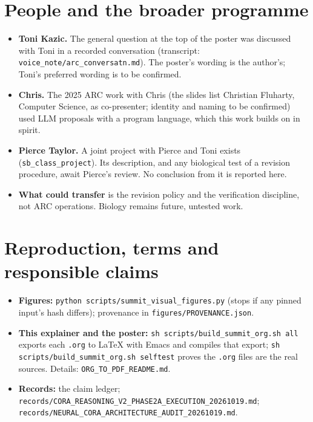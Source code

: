 \documentclass[11pt, a4paper]{article}
\begin{document}
\section{People and the broader programme}
\label{sec-people}
\begin{itemize}
\item \textbf{Toni Kazic.} The general question at the top of the poster was discussed with Toni in a recorded conversation
(transcript: \texttt{voice\_note/arc\_conversatn.md}). The poster's wording is the author's; Toni's preferred wording is to be
confirmed.
\item \textbf{Chris.} The 2025 ARC work with Chris (the slides list Christian Fluharty, Computer Science, as co-presenter;
identity and naming to be confirmed) used LLM proposals with a program language, which this work builds on in spirit.
\item \textbf{Pierce Taylor.} A joint project with Pierce and Toni exists (\texttt{sb\_class\_project}). Its description, and any biological
test of a revision procedure, await Pierce's review. No conclusion from it is reported here.
\item \textbf{What could transfer} is the revision policy and the verification discipline, not ARC operations. Biology remains
future, untested work.
\end{itemize}

\section{Reproduction, terms and responsible claims}
\label{sec-repro}
\begin{itemize}
\item \textbf{Figures:} \texttt{python scripts/summit\_visual\_figures.py} (stops if any pinned input's hash differs); provenance in
\texttt{figures/PROVENANCE.json}.
\item \textbf{This explainer and the poster:} \texttt{sh scripts/build\_summit\_org.sh all} exports each \texttt{.org} to \LaTeX{} with Emacs and
compiles that export; \texttt{sh scripts/build\_summit\_org.sh selftest} proves the \texttt{.org} files are the real sources. Details:
\texttt{ORG\_TO\_PDF\_README.md}.
\item \textbf{Records:} the claim ledger; \texttt{records/CORA\_REASONING\_V2\_PHASE2A\_EXECUTION\_20261019.md};
\texttt{records/NEURAL\_CORA\_ARCHITECTURE\_AUDIT\_20261019.md}.
\end{itemize}
\end{document}
